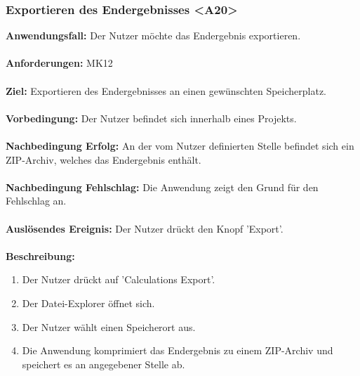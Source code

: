 \documentclass[parskip=full]{scrartcl} %
\begin{document}
\subsubsection*{Exportieren des Endergebnisses <A20>}
\textbf{Anwendungsfall:} Der Nutzer möchte das Endergebnis exportieren.\\\\
\textbf{Anforderungen:} MK12\\\\
\textbf{Ziel:} Exportieren des Endergebnisses an einen gewünschten Speicherplatz.\\\\
\textbf{Vorbedingung:}  Der Nutzer befindet sich innerhalb eines Projekts.\\\\
\textbf{Nachbedingung Erfolg:} An der vom Nutzer definierten Stelle befindet sich ein ZIP-Archiv, welches das Endergebnis enthält.\\\\
\textbf{Nachbedingung Fehlschlag:} Die Anwendung zeigt den Grund für den Fehlschlag an.\\\\
\textbf{Auslösendes Ereignis:} Der Nutzer drückt den Knopf 'Export'.\\\\
\textbf{Beschreibung:}
\begin{enumerate}
    \item Der Nutzer drückt auf 'Calculations Export'.
    \item Der Datei-Explorer öffnet sich.
    \item Der Nutzer wählt einen Speicherort aus.
    \item Die Anwendung komprimiert das Endergebnis zu einem ZIP-Archiv und speichert es an angegebener Stelle ab.
\end{enumerate}
\newpage
\end{document}
